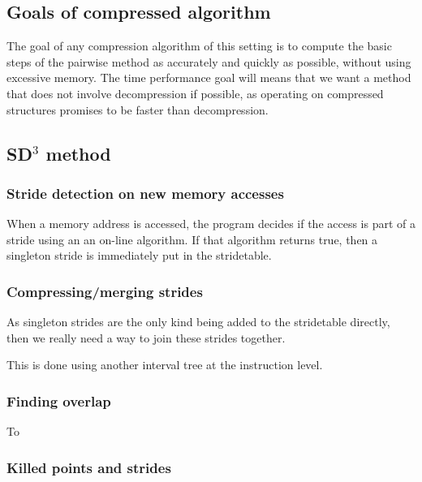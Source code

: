\documentclass[12pt,twoside]{reedthesis}
\begin{document}
		\subsection{Goals of compressed algorithm}
		The goal of any compression algorithm of this setting is to compute the basic steps of the pairwise method as accurately and quickly as possible, without using excessive memory. The time performance goal will means that we want a method that does not involve decompression if possible, as operating on compressed structures promises to be faster than decompression.


		\subsection{SD$^3$ method}

		\subsubsection{Stride detection on new memory accesses}

		When a memory address is accessed, the program decides if the access is part of a stride using an an on-line algorithm. If that algorithm returns true, then a singleton stride is immediately put in the stridetable.

		\subsubsection{Compressing/merging strides}

		As singleton strides are the only kind being added to the stridetable directly, then we really need a way to join these strides together.

		This is done using another interval tree at the instruction level.


		\subsubsection{Finding overlap}

		To

		\subsubsection{Killed points and strides}

\end{document}
